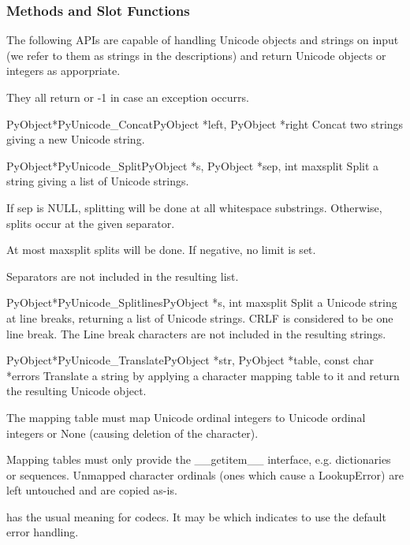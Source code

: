 \documentclass{manual}
\begin{document}

\subsubsection{Methods and Slot Functions \label{unicodeMethodsAndSlots}}

The following APIs are capable of handling Unicode objects and strings
on input (we refer to them as strings in the descriptions) and return
Unicode objects or integers as apporpriate.

They all return \NULL{} or -1 in case an exception occurrs.

\begin{cfuncdesc}{PyObject*}{PyUnicode_Concat}{PyObject *left,
                                               PyObject *right}
Concat two strings giving a new Unicode string.
\end{cfuncdesc}

\begin{cfuncdesc}{PyObject*}{PyUnicode_Split}{PyObject *s,
                                              PyObject *sep,
                                              int maxsplit}
Split a string giving a list of Unicode strings.

If sep is NULL, splitting will be done at all whitespace
substrings. Otherwise, splits occur at the given separator.

At most maxsplit splits will be done. If negative, no limit is set.

Separators are not included in the resulting list.
\end{cfuncdesc}

\begin{cfuncdesc}{PyObject*}{PyUnicode_Splitlines}{PyObject *s,
                                                   int maxsplit}
Split a Unicode string at line breaks, returning a list of Unicode
strings.  CRLF is considered to be one line break.  The Line break
characters are not included in the resulting strings.
\end{cfuncdesc}

\begin{cfuncdesc}{PyObject*}{PyUnicode_Translate}{PyObject *str,
                                                  PyObject *table,
                                                  const char *errors}
Translate a string by applying a character mapping table to it and
return the resulting Unicode object.

The mapping table must map Unicode ordinal integers to Unicode ordinal
integers or None (causing deletion of the character).

Mapping tables must only provide the __getitem__ interface,
e.g. dictionaries or sequences. Unmapped character ordinals (ones
which cause a LookupError) are left untouched and are copied as-is.

 has the usual meaning for codecs. It may be \NULL{}
which indicates to use the default error handling.
\end{cfuncdesc}
\end{document}
